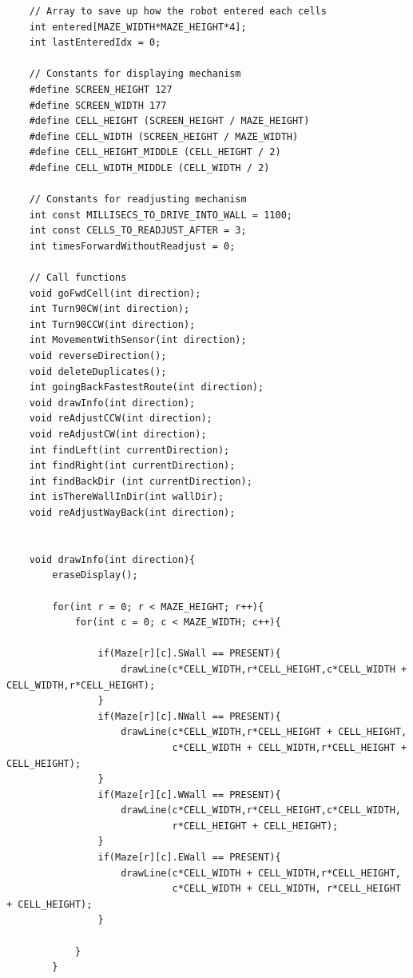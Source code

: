 \documentclass[11pt]{article}
\begin{document}
\begin{linenumbers}
\begin{verbatim}
    // Array to save up how the robot entered each cells
    int entered[MAZE_WIDTH*MAZE_HEIGHT*4];
    int lastEnteredIdx = 0;

    // Constants for displaying mechanism
    #define SCREEN_HEIGHT 127
    #define	SCREEN_WIDTH 177
    #define CELL_HEIGHT	(SCREEN_HEIGHT / MAZE_HEIGHT)
    #define CELL_WIDTH (SCREEN_HEIGHT / MAZE_WIDTH)
    #define CELL_HEIGHT_MIDDLE (CELL_HEIGHT / 2)
    #define CELL_WIDTH_MIDDLE (CELL_WIDTH / 2)

    // Constants for readjusting mechanism
    int const MILLISECS_TO_DRIVE_INTO_WALL = 1100;
    int const CELLS_TO_READJUST_AFTER = 3;
    int timesForwardWithoutReadjust = 0;

    // Call functions
    void goFwdCell(int direction);
    int Turn90CW(int direction);
    int Turn90CCW(int direction);
    int MovementWithSensor(int direction);
    void reverseDirection();
    void deleteDuplicates();
    int goingBackFastestRoute(int direction);
    void drawInfo(int direction);
    void reAdjustCCW(int direction);
    void reAdjustCW(int direction);
    int findLeft(int currentDirection);
    int findRight(int currentDirection);
    int findBackDir (int currentDirection);
    int isThereWallInDir(int wallDir);
    void reAdjustWayBack(int direction);


    void drawInfo(int direction){
        eraseDisplay();

        for(int r = 0; r < MAZE_HEIGHT; r++){
            for(int c = 0; c < MAZE_WIDTH; c++){

                if(Maze[r][c].SWall == PRESENT){
                    drawLine(c*CELL_WIDTH,r*CELL_HEIGHT,c*CELL_WIDTH + CELL_WIDTH,r*CELL_HEIGHT);
                }
                if(Maze[r][c].NWall == PRESENT){
                    drawLine(c*CELL_WIDTH,r*CELL_HEIGHT + CELL_HEIGHT,
                             c*CELL_WIDTH + CELL_WIDTH,r*CELL_HEIGHT + CELL_HEIGHT);
                }
                if(Maze[r][c].WWall == PRESENT){
                    drawLine(c*CELL_WIDTH,r*CELL_HEIGHT,c*CELL_WIDTH,
                             r*CELL_HEIGHT + CELL_HEIGHT);
                }
                if(Maze[r][c].EWall == PRESENT){
                    drawLine(c*CELL_WIDTH + CELL_WIDTH,r*CELL_HEIGHT,
                             c*CELL_WIDTH + CELL_WIDTH, r*CELL_HEIGHT + CELL_HEIGHT);
                }

            }
        }


\end{verbatim}
\end{linenumbers}
\end{document}
